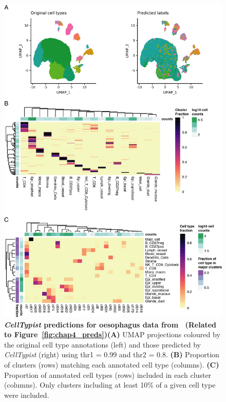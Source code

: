\begin{figure}[pht!] 
\centering
\includegraphics[scale=0.81]{Appendix2/Figs/appB_oes.png} %
\caption[\textit{CellTypist} predictions for oesophagus data from~\citep{madissoon_lung_2019}]{\textbf{\textit{CellTypist} predictions for oesophagus data from~\citep{madissoon_lung_2019} (Related to Figure~\ref{fig:chap4_preds})}\newline\textbf{(A)} UMAP projections coloured by the original cell type annotations (left) and those predicted by \textit{CellTypist} (right) using thr1 = 0.99 and thr2 = 0.8. \textbf{(B)} Proportion of clusters (rows) matching each annotated cell type (columns). \textbf{(C)} Proportion of annotated cell types (rows) included in each cluster (columns). Only clusters including at least 10\% of a given cell type were included.}
\label{fig:appB_oes}
\end{figure}


